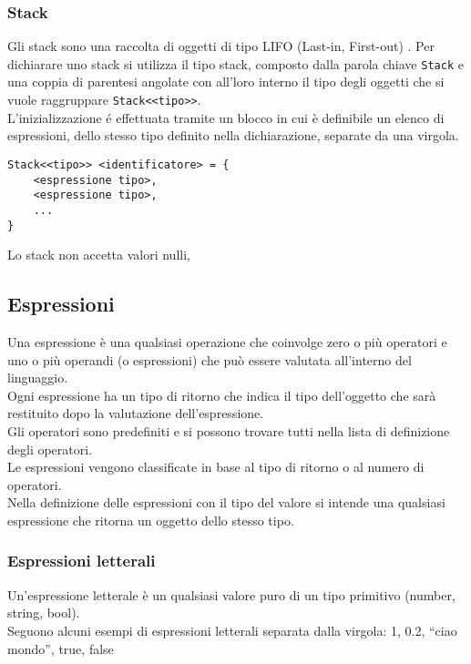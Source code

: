 \newpage

\subsubsection{Stack}
Gli stack sono una raccolta di oggetti di tipo LIFO (Last-in, First-out) \cite{CSharpLang}.
Per dichiarare uno stack si utilizza il tipo stack, composto dalla parola chiave \lstinline|Stack|
e una coppia di parentesi angolate con all'loro interno il tipo degli oggetti che si vuole raggruppare
\lstinline|Stack<<tipo>>|. \\
L'inizializzazione é effettuata tramite un blocco in cui è definibile un elenco di espressioni,
dello stesso tipo definito nella dichiarazione, separate da una virgola.
\begin{lstlisting}
Stack<<tipo>> <identificatore> = {
    <espressione tipo>,
    <espressione tipo>,
    ...
}
\end{lstlisting}
Lo stack non accetta valori nulli, 


\subsection{Espressioni}
Una espressione è una qualsiasi operazione che coinvolge zero o più operatori e uno o più operandi 
(o espressioni) che può essere valutata all’interno del linguaggio. \\
Ogni espressione ha un tipo di ritorno che indica il tipo dell’oggetto che sarà restituito dopo la valutazione 
dell’espressione. \\
Gli operatori sono predefiniti e si possono trovare tutti nella lista di definizione degli operatori. \\
Le espressioni vengono classificate in base al tipo di ritorno o al numero di operatori.
\\
Nella definizione delle espressioni con il tipo del valore si intende una qualsiasi espressione che ritorna 
un oggetto dello stesso tipo.

\subsubsection{Espressioni letterali}
Un’espressione letterale è un qualsiasi valore puro di un tipo primitivo (number, string, bool). \\
Seguono alcuni esempi di espressioni letterali separata dalla virgola: 1, 0.2, “ciao mondo”, true, false

